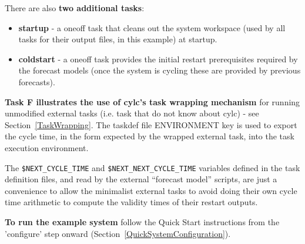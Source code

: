 There are also {\bf two additional tasks}:

\begin{itemize}
    \item {\bf startup} - a oneoff task that cleans out the system
    workspace (used by all tasks for their output files, in this
    example) at startup.
    \item {\bf coldstart} - a oneoff task provides the initial restart
    prerequisites required by the forecast models (once the system
    is cycling these are provided by previous forecasts). 
\end{itemize}

{\bf Task F illustrates the use of cylc's task wrapping mechanism} for
running unmodified external tasks (i.e. task that do not know about
cylc) - see Section~\ref{TaskWrapping}. The taskdef file ENVIRONMENT key
is used to export the cycle time, in the form expected by the wrapped
external task, into the task execution environment.

The \lstinline=$NEXT_CYCLE_TIME= and \lstinline=$NEXT_NEXT_CYCLE_TIME=
variables defined in the task definition files, and read by the external
``forecast model'' scripts, are just a convenience to allow the minimalist
external tasks to avoid doing their own cycle time arithmetic to compute
the validity times of their restart outputs.

{\bf To run the example system} follow the Quick Start instructions from
the 'configure' step onward (Section~\ref{QuickSystemConfiguration}).

